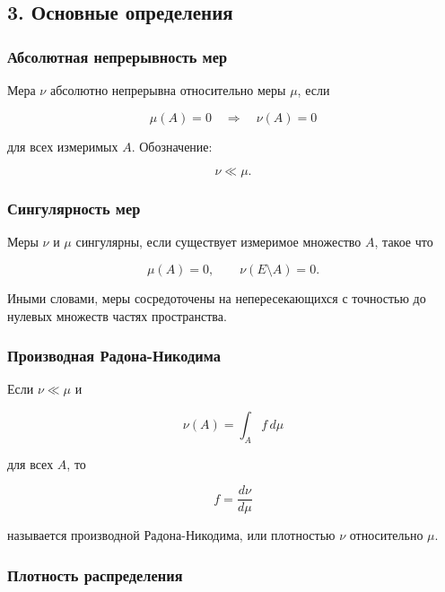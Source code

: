 \documentclass[
  11pt,
  a4paper,
]{article}
\begin{document}
\subsection{3. Основные
определения}\label{ux43eux441ux43dux43eux432ux43dux44bux435-ux43eux43fux440ux435ux434ux435ux43bux435ux43dux438ux44f}

\subsubsection{Абсолютная непрерывность
мер}\label{ux430ux431ux441ux43eux43bux44eux442ux43dux430ux44f-ux43dux435ux43fux440ux435ux440ux44bux432ux43dux43eux441ux442ux44c-ux43cux435ux440-1}

Мера \(\nu\) абсолютно непрерывна относительно меры \(\mu\), если

\[
\mu(A)=0\quad\Rightarrow\quad \nu(A)=0
\]

для всех измеримых \(A\). Обозначение:

\[
\nu\ll\mu.
\]

\subsubsection{Сингулярность
мер}\label{ux441ux438ux43dux433ux443ux43bux44fux440ux43dux43eux441ux442ux44c-ux43cux435ux440}

Меры \(\nu\) и \(\mu\) сингулярны, если существует измеримое множество
\(A\), такое что

\[
\mu(A)=0,\qquad \nu(E\setminus A)=0.
\]

Иными словами, меры сосредоточены на непересекающихся с точностью до
нулевых множеств частях пространства.

\subsubsection{Производная
Радона-Никодима}\label{ux43fux440ux43eux438ux437ux432ux43eux434ux43dux430ux44f-ux440ux430ux434ux43eux43dux430-ux43dux438ux43aux43eux434ux438ux43cux430}

Если \(\nu\ll\mu\) и

\[
\nu(A)=\int_A f\,d\mu
\]

для всех \(A\), то

\[
f=\frac{d\nu}{d\mu}
\]

называется производной Радона-Никодима, или плотностью \(\nu\)
относительно \(\mu\).

\subsubsection{Плотность
распределения}\label{ux43fux43bux43eux442ux43dux43eux441ux442ux44c-ux440ux430ux441ux43fux440ux435ux434ux435ux43bux435ux43dux438ux44f}
\end{document}
